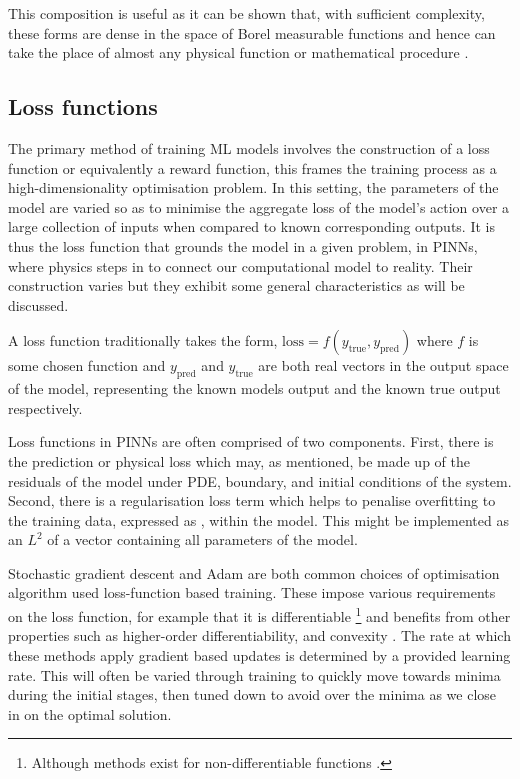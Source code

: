 This composition is useful as it can be shown that, with sufficient complexity, these forms are dense in the space of Borel measurable functions and hence can take the place of almost any physical function or mathematical procedure \cite{hornikMultilayerFeedforwardNetworks1989}.

\subsection{Loss functions}
\label{sec:intro-lf}

The primary method of training ML models involves the construction of a loss function or equivalently a reward function, this frames the training process as a high-dimensionality optimisation problem. In this setting, the parameters of the model are varied so as to minimise the aggregate loss of the model's action over a large collection of inputs when compared to known corresponding outputs. It is thus the loss function that grounds the model in a given problem, in PINNs, where physics steps in to connect our computational model to reality. Their construction varies but they exhibit some general characteristics as will be discussed.

A loss function traditionally takes the form, $\mathrm{loss} = f(y_{\text{true}}, y_{\text{pred}})$ where $f$ is some chosen function and $y_{\text{pred}}$ and $y_{\text{true}}$ are both real vectors in the output space of the model, representing the known models output and the known true output respectively.

Loss functions in PINNs are often comprised of two components. First, there is the prediction or physical loss which may, as mentioned, be made up of the residuals of the model under PDE, boundary, and initial conditions of the system. Second, there is a regularisation loss term which helps to penalise overfitting to the training data, expressed as , within the model. This might be implemented as an $L^2$ of a vector containing all parameters of the model.
\columnsep

Stochastic gradient descent and Adam \cite{kingmaAdamMethodStochastic2017} are both common choices of optimisation algorithm used loss-function based training. These impose various requirements on the loss function, for example that it is differentiable \footnote{Although methods exist for non-differentiable functions \cite{daubechiesIterativeThresholdingAlgorithm2003}.} and benefits from other properties such as higher-order differentiability, and convexity \cite{sraOptimizationMachineLearning2012}. The rate at which these methods apply gradient based updates is determined by a provided learning rate. This will often be varied through training to quickly move towards minima during the initial stages, then tuned down to avoid  over the minima as we close in on the optimal solution.

